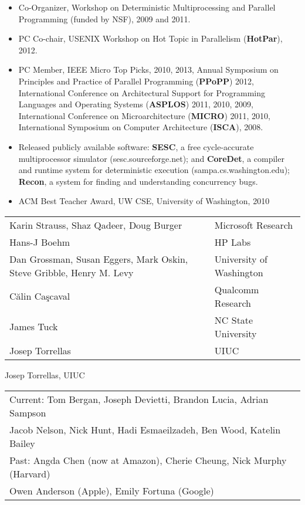 \noindent\begin{itemize}
\item Co-Organizer, Workshop on Deterministic Multiprocessing and Parallel Programming (funded by NSF), 2009 and 2011. 

\item PC Co-chair,  USENIX Workshop on Hot Topic in Parallelism ({\bf HotPar}), 2012.

\item PC Member, IEEE Micro Top Picks, 2010, 2013, Annual Symposium on
Principles and Practice of Parallel Programming ({\bf PPoPP}) 2012,
International Conference on Architectural Support for Programming Languages
and Operating Systems ({\bf ASPLOS}) 2011, 2010, 2009, International
Conference on Microarchitecture ({\bf MICRO}) 2011, 2010, International
Symposium on Computer Architecture ({\bf ISCA}), 2008.

\item Released publicly available software: {\bf SESC}, a free cycle-accurate multiprocessor simulator (sesc.sourceforge.net); and {\bf CoreDet}, a compiler and runtime system for deterministic execution (sampa.cs.washington.edu); {\bf Recon}, a system for finding and understanding concurrency bugs. 

\item ACM Best Teacher Award, UW CSE, University of Washington, 2010
  
\end{itemize}

\nextthing
{}

\noindent\begin{tabular}{ll}
  Karin Strauss, Shaz Qadeer, Doug Burger & Microsoft Research \\
  Hans-J Boehm  & HP Labs \\
  Dan Grossman, Susan Eggers, Mark Oskin, Steve Gribble, Henry M.  Levy  & University of Washington \\
  C\u{a}lin Ca\c{s}caval & Qualcomm Research \\
  James Tuck & NC State University \\
  Josep Torrellas & UIUC 
\end{tabular}

\nextthing
{} Josep Torrellas, UIUC

\nextthing
{}

\noindent\begin{tabular}{l}
  Current: Tom Bergan, Joseph Devietti, Brandon Lucia, Adrian Sampson \\ 
  \hspace{1cm} Jacob Nelson, Nick Hunt, Hadi Esmaeilzadeh, Ben Wood, Katelin Bailey\\
  Past: Angda Chen (now at Amazon), Cherie Cheung, Nick Murphy (Harvard) \\
  \hspace{1cm} Owen Anderson (Apple), Emily Fortuna (Google) \\
\end{tabular}
